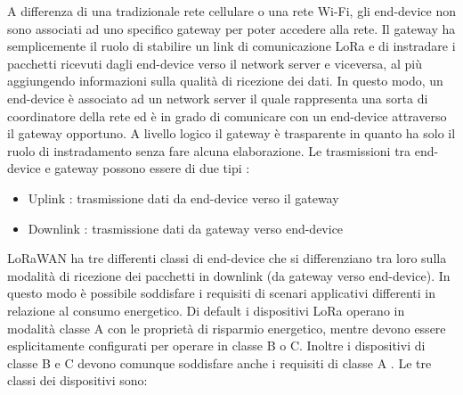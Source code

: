 \documentclass[12pt,a4paper,openright,twoside]{report}
\begin{document}
A differenza di una tradizionale rete cellulare o una rete Wi-Fi, gli end-device non sono associati ad uno specifico gateway per poter accedere alla rete. Il gateway ha semplicemente il ruolo di stabilire un link di comunicazione LoRa e di instradare i pacchetti ricevuti dagli end-device verso il network server e viceversa, al pi\`u aggiungendo informazioni sulla qualit\`a di ricezione dei dati. In questo modo, un end-device \`e associato ad un network server il quale rappresenta una sorta di coordinatore della rete ed \`e in grado di comunicare con un end-device attraverso il gateway opportuno. A livello logico il gateway \`e trasparente in quanto ha solo il ruolo di instradamento senza fare alcuna elaborazione.
Le trasmissioni tra end-device e gateway possono essere di due tipi :
\begin{itemize}                       
\item Uplink : trasmissione dati da end-device verso il gateway
\item Downlink : trasmissione dati da gateway verso end-device
\end{itemize}
LoRaWAN ha tre differenti classi di end-device che si differenziano tra loro sulla modalità di ricezione dei pacchetti in downlink (da gateway verso end-device). In questo modo è possibile soddisfare i requisiti di scenari applicativi differenti in relazione al consumo energetico. Di default i dispositivi LoRa operano in modalità classe A con le proprietà di risparmio energetico, mentre devono essere esplicitamente configurati per operare in classe B o C. Inoltre i dispositivi di classe B e C devono comunque soddisfare anche i requisiti di classe A \cite{K22}.
Le tre classi dei dispositivi sono:
\end{document}
